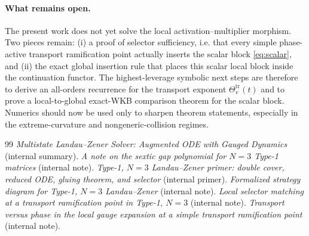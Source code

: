 \documentclass[aps,prl,reprint,superscriptaddress,nofootinbib]{revtex4-2}
\begin{document}
\paragraph*{What remains open.}
The present work does not yet solve the local activation--multiplier morphism. Two pieces remain: (i) a proof of selector sufficiency, i.e. that every simple phase-active transport ramification point actually inserts the scalar block \eqref{eq:scalar}, and (ii) the exact global insertion rule that places this scalar local block inside the continuation functor. The highest-leverage symbolic next steps are therefore to derive an all-orders recurrence for the transport exponent $\Theta_v^{\mathrm{tr}}(t)$ and to prove a local-to-global exact-WKB comparison theorem for the scalar block. Numerics should now be used only to sharpen theorem statements, especially in the extreme-curvature and nongeneric-collision regimes.

\begin{thebibliography}{99}
 \emph{Multistate Landau--Zener Solver: Augmented ODE with Gauged Dynamics} (internal summary).
 \emph{A note on the sextic gap polynomial for $N=3$ Type-1 matrices} (internal note).
 \emph{Type-1, $N=3$ Landau--Zener primer: double cover, reduced ODE, gluing theorem, and selector} (internal primer).
 \emph{Formalized strategy diagram for Type-1, $N=3$ Landau--Zener} (internal note).
 \emph{Local selector matching at a transport ramification point in Type-1, $N=3$} (internal note).
 \emph{Transport versus phase in the local gauge expansion at a simple transport ramification point} (internal note).
\end{thebibliography}
\end{document}
